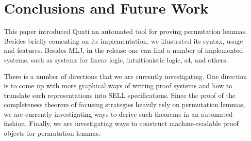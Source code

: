 \documentclass{llncs}
\begin{document}
\section{Conclusions and Future Work}
\label{sec:conc}
This paper introduced Quati an automated tool for proving permutation lemmas. Besides briefly 
comenting on its implementation, we illustrated its syntax, usage and features. Besides MLJ, in the release
one can find a number of implemented systems, such as systems for linear logic, intuitionistic logic, s4, 
and others. 

There is a number of directions that we are currently investigating. One direction is to come up with 
more graphical ways of writing proof systems and how to translate such representations into SELL specifications. 
Since the proof of the completeness theorem of focusing strategies heavily rely on permutation lemmas, we are 
currently investigating ways to derive such theorems in an automated fashion. Finally, we are investigating
ways to construct machine-readable proof objects for permutation lemmas.








\newpage
\appendix
\end{document}
